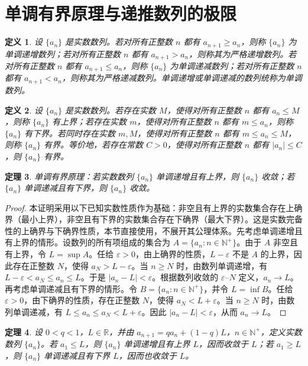 \documentclass[UTF8,fontset=fandol,11pt]{ctexart}
\newtheorem{definition}{定义}[section]
\newtheorem{theorem}[definition]{定理}
\begin{document}
\section{单调有界原理与递推数列的极限}\label{sec:S04}
\begin{definition}
\label{def:monotone-sequence}设 $\{a_n\}$ 是实数数列。若对所有正整数 $n$ 都有 $a_{n+1}\geq a_n$，则称 $\{a_n\}$ 为单调递增数列；若对所有正整数 $n$ 都有 $a_{n+1}>a_n$，则称其为严格递增数列。若对所有正整数 $n$ 都有 $a_{n+1}\leq a_n$，则称 $\{a_n\}$ 为单调递减数列；若对所有正整数 $n$ 都有 $a_{n+1}<a_n$，则称其为严格递减数列。单调递增或单调递减的数列统称为单调数列。
\end{definition}
\begin{definition}
\label{def:bounded-sequence}设 $\{a_n\}$ 是实数数列。若存在实数 $M$，使得对所有正整数 $n$ 都有 $a_n\leq M$，则称 $\{a_n\}$ 有上界；若存在实数 $m$，使得对所有正整数 $n$ 都有 $m\leq a_n$，则称 $\{a_n\}$ 有下界。若同时存在实数 $m,M$，使得对所有正整数 $n$ 都有 $m\leq a_n\leq M$，则称 $\{a_n\}$ 有界。等价地，若存在常数 $C>0$，使得对所有正整数 $n$ 都有 $|a_n|\leq C$，则 $\{a_n\}$ 有界。
\end{definition}
\begin{theorem}
\label{thm:monotone-bounded}单调有界原理：若实数数列 $\{a_n\}$ 单调递增且有上界，则 $\{a_n\}$ 收敛；若 $\{a_n\}$ 单调递减且有下界，则 $\{a_n\}$ 收敛。
\end{theorem}
\begin{proof}
本证明采用以下已知实数性质作为基础：非空且有上界的实数集合存在上确界（最小上界），非空且有下界的实数集合存在下确界（最大下界）。这是实数完备性的上确界与下确界性质，本节直接使用，不展开其公理体系。先考虑单调递增且有上界的情形。设数列的所有项组成的集合为 $A=\{a_n:n\in\mathbb{N}^{+}\}$。由于 $A$ 非空且有上界，令 $L=\sup A$。任给 $\varepsilon>0$，由上确界的性质，$L-\varepsilon$ 不是 $A$ 的上界，因此存在正整数 $N$，使得 $a_N>L-\varepsilon$。当 $n\geq N$ 时，由数列单调递增，有 $L-\varepsilon<a_N\leq a_n\leq L$。于是 $|a_n-L|<\varepsilon$。根据数列收敛的 $\varepsilon$--$N$ 定义，$a_n\to L$。再考虑单调递减且有下界的情形。令 $B=\{a_n:n\in\mathbb{N}^{+}\}$，并令 $L=\inf B$。任给 $\varepsilon>0$，由下确界的性质，存在正整数 $N$，使得 $a_N<L+\varepsilon$。当 $n\geq N$ 时，由数列单调递减，有 $L\leq a_n\leq a_N<L+\varepsilon$。因此 $|a_n-L|<\varepsilon$，从而 $a_n\to L$。
\end{proof}
\begin{theorem}
\label{thm:recursive-limit-method}设 $0<q<1$，$L\in\mathbb{R}$，并由 $a_{n+1}=q a_n+(1-q)L$，$n\in\mathbb{N}^{+}$，定义实数数列 $\{a_n\}$。若 $a_1\leq L$，则 $\{a_n\}$ 单调递增且有上界 $L$，因而收敛于 $L$；若 $a_1\geq L$，则 $\{a_n\}$ 单调递减且有下界 $L$，因而也收敛于 $L$。
\end{theorem}
\end{document}

